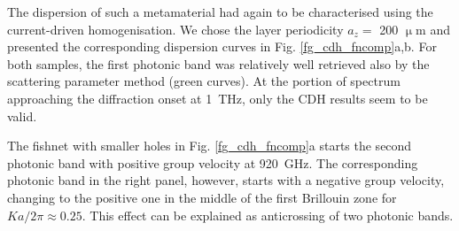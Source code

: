 The dispersion of such a metamaterial had again to be characterised using the current-driven homogenisation. We chose the layer periodicity $a_z = $ 200 $\upmu$m and presented the corresponding dispersion curves in Fig. \ref{fg_cdh_fncomp}a,b. For both samples, the first photonic band was relatively well retrieved also by the scattering parameter method (green curves). At the portion of spectrum approaching the diffraction onset at 1~THz, only the CDH results seem to be valid. 

The fishnet with smaller holes in Fig. \ref{fg_cdh_fncomp}a starts the second photonic band with positive group velocity at 920~GHz. The corresponding photonic band in the right panel, however, starts with a negative group velocity, changing to the positive one in the middle of the first Brillouin zone for $Ka/2\pi \approx 0.25$. This effect can be explained as anticrossing of two photonic bands. %



